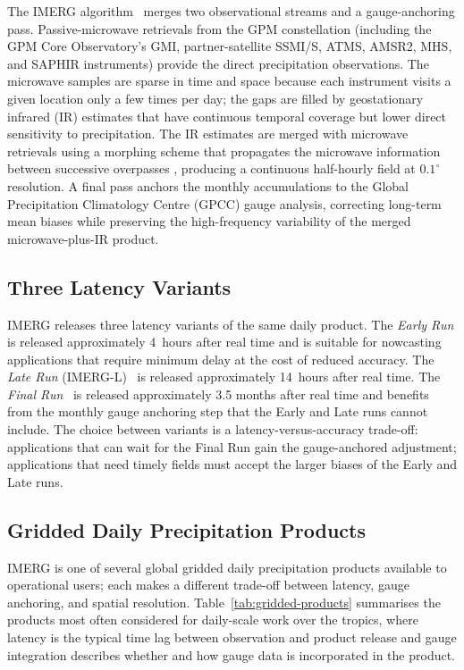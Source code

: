 The IMERG algorithm~\citep{ref:huffman2020} merges two
observational streams and a gauge-anchoring pass.
Passive-microwave retrievals from the GPM constellation
(including the GPM Core Observatory's GMI, partner-satellite
SSMI/S, ATMS, AMSR2, MHS, and SAPHIR instruments) provide the
direct precipitation observations. The microwave samples are
sparse in time and space because each instrument visits a given
location only a few times per day; the gaps are filled by
geostationary infrared (IR) estimates that have continuous
temporal coverage but lower direct sensitivity to precipitation.
The IR estimates are merged with microwave retrievals using a
morphing scheme that propagates the microwave information
between successive overpasses \citep{ref:joyce2004}, producing a continuous
half-hourly field at $0.1^{\circ}$ resolution. A final pass
anchors the monthly accumulations to the Global Precipitation
Climatology Centre (GPCC) gauge analysis, correcting long-term
mean biases while preserving the high-frequency variability of
the merged microwave-plus-IR product.

\subsection{Three Latency Variants}

IMERG releases three latency variants of the same daily product.
The \textit{Early Run} is released approximately 4~hours after
real time and is suitable for nowcasting applications that
require minimum delay at the cost of reduced accuracy. The
\textit{Late Run} (IMERG-L)~\citep{ref:imergdl07} is released
approximately 14~hours after real time. The
\textit{Final Run}~\citep{ref:imergdf07} is released
approximately 3.5 months after real time and benefits from the
monthly gauge anchoring step
that the Early and Late runs cannot include. The choice between
variants is a latency-versus-accuracy trade-off: applications
that can wait for the Final Run gain the gauge-anchored
adjustment; applications that need timely fields must accept
the larger biases of the Early and Late runs.

\subsection{Gridded Daily Precipitation Products}

IMERG is one of several global gridded daily precipitation
products available to operational users; each makes a different
trade-off between latency, gauge anchoring, and spatial
resolution. Table~\ref{tab:gridded-products} summarises the
products most often considered for daily-scale work over the
tropics, where latency is the typical time lag between
observation and product release and gauge integration describes
whether and how gauge data is incorporated in the product.

